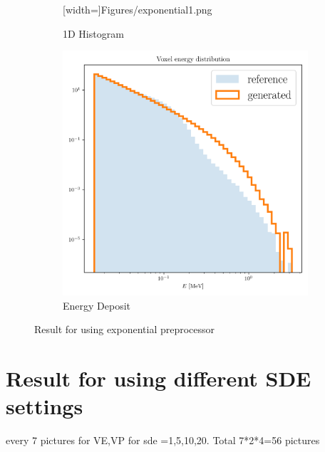 \begin{figure}
\begin{subfigure}[b]{0.3\textwidth}
        [width=\textwidth]{Figures/exponential1.png}
        \caption{1D Histogram}
        \label{fig:exp1}
    \end{subfigure}
    \hfill
    \begin{subfigure}[b]{0.3\textwidth}
        \centering
        \includegraphics[width=\textwidth]{Figures/exponential6.png}
        \caption{Energy Deposit}
        \label{fig:exp6}
    \end{subfigure}
    \caption{Result for using exponential preprocessor}
\end{figure}

\newpage
\section{Result for using different SDE settings}
every 7 pictures for VE,VP for sde =1,5,10,20. Total 7*2*4=56 pictures

